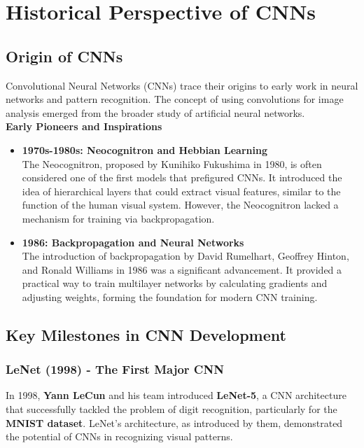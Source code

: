 \chapter{Historical Perspective of CNNs}\label{chp:2}
\section{Origin of CNNs}
Convolutional Neural Networks (CNNs) trace their origins to early work in neural networks and pattern recognition. The concept of using convolutions for image analysis emerged from the broader study of artificial neural networks.\\

\textbf{Early Pioneers and Inspirations}
\begin{itemize}
    \item \textbf{1970s-1980s: Neocognitron and Hebbian Learning}\\
    The Neocognitron, proposed by Kunihiko Fukushima in 1980, is often considered one of the first models that prefigured CNNs. It introduced the idea of hierarchical layers that could extract visual features, similar to the function of the human visual system. However, the Neocognitron lacked a mechanism for training via backpropagation.\cite{fukushima1980neocognitron}
    \item \textbf{1986: Backpropagation and Neural Networks}\\
    The introduction of backpropagation by David Rumelhart, Geoffrey Hinton, and Ronald Williams in 1986 was a significant advancement. It provided a practical way to train multilayer networks by calculating gradients and adjusting weights, forming the foundation for modern CNN training.\cite{rumelhart1986learning}
\end{itemize}

\section{Key Milestones in CNN Development}
\subsection{LeNet (1998) - The First Major CNN}
In 1998, \textbf{Yann LeCun} and his team introduced \textbf{LeNet-5}, a CNN architecture that successfully tackled the problem of digit recognition, particularly for the \textbf{MNIST dataset}. LeNet’s architecture, as introduced by them, demonstrated the potential of CNNs in recognizing visual patterns.\cite{lecun1998gradient, lecun1990handwritten}\\

